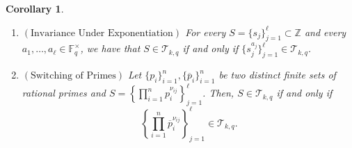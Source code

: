 \documentclass[12pt]{amsart}
\newtheorem{corollary}[theorem]{Corollary}
\newcommand{\F}{{\mathbb F}}
\begin{document}
\begin{corollary}\label{cor:indendenceprimes}
    \begin{enumerate}
        \item $\left( \text{Invariance Under Exponentiation} \right)$ For every $S = \{s_{j}\}_{j=1}^{\ell} \subset\mathbb{Z}$ and every $a_1,\ldots,a_{\ell} \in \F_q^{\times}$, we have that $S \in \mathcal{T}_{k,q}$ if and only if  $\{s_{j}^{a_j}\}_{j=1}^{\ell} \in \mathcal{T}_{k,q}$. \vspace{2mm}

        \item $\left( \text{Switching of Primes} \right)$  Let $\{p_{i}\}_{i=1}^{n}, \{\overline{p}_{i}\}_{i=1}^{n}$ be two distinct finite sets of rational primes and $S = \left\{\prod_{i=1}^{n} p_{i}^{\nu_{ij}}\right\}_{j=1}^{\ell}$. Then, $S \in \mathcal{T}_{k,q}$ if and only if 
    \[\left\{\prod_{i=1}^n\overline{p}_{i}^{\nu_{ij}}\right\}_{j=1}^{\ell} \in \mathcal{T}_{k,q}.\] \label{secondbasiccorollary}
    \end{enumerate}   
\end{corollary}
\end{document}
